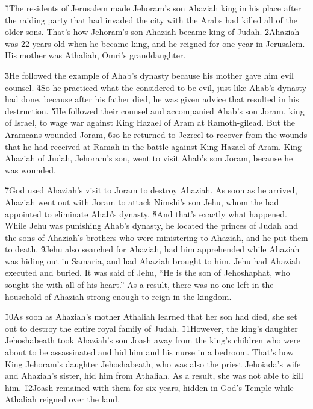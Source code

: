 \v{1}The residents of Jerusalem made Jehoram's son Ahaziah king in his place after the raiding party that had invaded the city with the Arabs had killed all of the older sons. That's how Jehoram's son Ahaziah became king of Judah. \v{2}Ahaziah was 22 years old when he became king, and he reigned for one year in Jerusalem. His mother was Athaliah, Omri's granddaughter.

\v{3}He followed the example of Ahab's dynasty because his mother gave him evil counsel. \v{4}So he practiced what the  considered to be evil, just like Ahab's dynasty had done, because after his father died, he was given advice that resulted in his destruction. \v{5}He followed their counsel and accompanied Ahab's son Joram, king of Israel, to wage war against King Hazael of Aram at Ramoth-gilead. But the Arameans wounded Joram, \v{6}so he returned to Jezreel to recover from the wounds that he had received at Ramah in the battle against King Hazael of Aram. King Ahaziah of Judah, Jehoram's son, went to visit Ahab's son Joram, because he was wounded.

\v{7}God used Ahaziah's visit to Joram to destroy Ahaziah. As soon as he arrived, Ahaziah went out with Joram to attack Nimshi's son Jehu, whom the  had appointed to eliminate Ahab's dynasty. \v{8}And that's exactly what happened. While Jehu was punishing Ahab's dynasty, he located the princes of Judah and the sons of Ahaziah's brothers who were ministering to Ahaziah, and he put them to death. \v{9}Jehu also searched for Ahaziah, had him apprehended while Ahaziah was hiding out in Samaria, and had Ahaziah brought to him. Jehu had Ahaziah executed and buried. It was said of Jehu, ``He is the son of Jehoshaphat, who sought the  with all of his heart.'' As a result, there was no one left in the household of Ahaziah strong enough to reign in the kingdom.

\v{10}As soon as Ahaziah's mother Athaliah learned that her son had died, she set out to destroy the entire royal family of Judah. \v{11}However, the king's daughter Jehoshabeath took Ahaziah's son Joash away from the king's children who were about to be assassinated and hid him and his nurse in a bedroom. That's how King Jehoram's daughter Jehoshabeath, who was also the priest Jehoiada's wife and Ahaziah's sister, hid him from Athaliah. As a result, she was not able to kill him. \v{12}Joash remained with them for six years, hidden in God's Temple while Athaliah reigned over the land.

